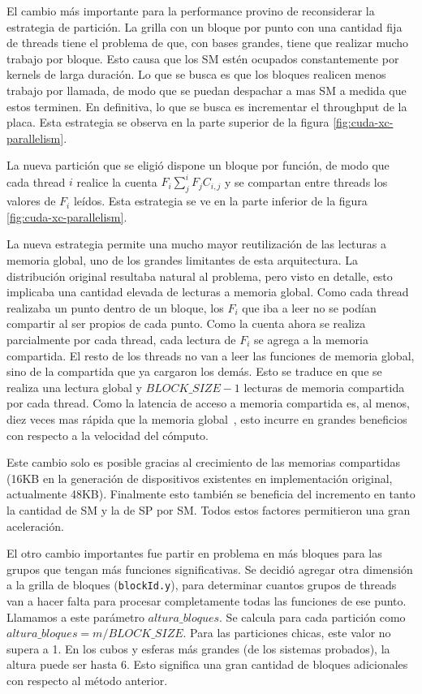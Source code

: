 El cambio m\'as importante para la performance provino de reconsiderar
la estrategia de partici\'on. La grilla con un bloque por punto con una cantidad
fija de threads tiene el problema de que, con bases grandes, tiene que realizar
mucho trabajo por bloque. Esto causa que los SM est\'en ocupados constantemente
por kernels de larga duraci\'on. Lo que se busca es que los  bloques realicen
menos trabajo por llamada, de modo que se puedan despachar a mas SM a medida
que estos terminen. En definitiva, lo que se busca es incrementar el throughput
de la placa. Esta estrategia se observa en la parte superior de la figura
\ref{fig:cuda-xc-parallelism}.

La nueva partici\'on que se eligi\'o dispone un bloque por funci\'on,
de modo que cada thread $i$ realice la cuenta $F_i \sum_{j}^{i} F_j C_{i,j}$
y se compartan entre threads los valores de $F_i$ le\'idos.
Esta estrategia se ve en la parte inferior de la figura \ref{fig:cuda-xc-parallelism}.

La nueva estrategia permite una mucho mayor reutilizaci\'on de las lecturas a memoria
global, uno de los grandes limitantes de esta arquitectura.
La distribuci\'on original resultaba natural al problema, pero visto en detalle, esto
implicaba una cantidad elevada de lecturas a memoria global. Como cada thread realizaba un
punto dentro de un bloque, los $F_i$ que iba a leer no se pod\'ian compartir al ser
propios de cada punto. Como la cuenta ahora se realiza parcialmente por cada thread,
cada lectura de $F_i$ se agrega a la memoria compartida. El resto de los threads no van
a leer las funciones  de memoria global, sino de la compartida que ya cargaron los dem\'as. Esto
se traduce en que se realiza una lectura global y $BLOCK\_SIZE-1$ lecturas
de memoria compartida por cada thread. Como la latencia de acceso a memoria compartida
es, al menos, diez veces mas r\'apida que la memoria global~\cite{Demystifying}, esto incurre en grandes
beneficios con respecto a la velocidad del c\'omputo.

Este cambio solo es posible gracias al crecimiento de las memorias compartidas (16KB en la generaci\'on de
dispositivos existentes en implementaci\'on original, actualmente 48KB). Finalmente
esto tambi\'en se beneficia del incremento en tanto la cantidad de SM y la de SP por
SM. Todos estos factores permitieron una gran aceleraci\'on.

El otro cambio importantes fue partir en problema en m\'as bloques para las grupos que tengan
m\'as funciones significativas. Se decidi\'o agregar otra dimensi\'on a la grilla de bloques (\texttt{blockId.y}),
para determinar cuantos grupos de threads van a hacer falta para procesar completamente
todas las funciones de ese punto. Llamamos a este par\'ametro $altura\_bloques$. Se
calcula para cada partici\'on como $altura\_bloques = {m}/{BLOCK\_SIZE}$.
Para las particiones chicas, este valor no supera a 1. En los cubos y esferas m\'as
grandes (de los sistemas probados), la altura puede ser hasta 6. Esto significa una gran
cantidad de bloques adicionales con respecto al m\'etodo anterior.

